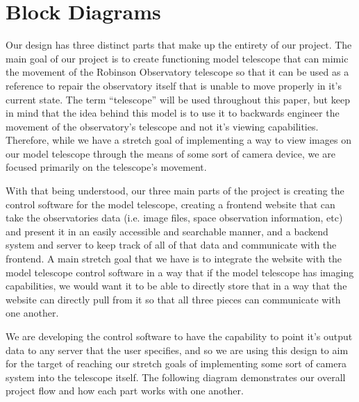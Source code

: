 \documentclass[12pt]{article}
\begin{document}
\section{Block Diagrams}

Our design has three distinct parts that make up the entirety of our project. The main goal of our project is to create functioning model telescope that can mimic the movement of the Robinson Observatory telescope so that it can be used as a reference to repair the observatory itself that is unable to move properly in it’s current state. The term “telescope” will be used throughout this paper, but keep in mind that the idea behind this model is to use it to backwards engineer the movement of the observatory’s telescope and not it’s viewing capabilities. Therefore, while we have a stretch goal of implementing a way to view images on our model telescope through the means of some sort of camera device, we are focused primarily on the telescope’s movement.

With that being understood, our three main parts of the project is creating the control software for the model telescope, creating a frontend website that can take the observatories data (i.e. image files, space observation information, etc) and present it in an easily accessible and searchable manner, and a backend system and server to keep track of all of that data and communicate with the frontend. A main stretch goal that we have is to integrate the website with the model telescope control software in a way that if the model telescope has imaging capabilities, we would want it to be able to directly store that in a way that the website can directly pull from it so that all three pieces can communicate with one another.

We are developing the control software to have the capability to point it’s output data to any server that the user specifies, and so we are using this design to aim for the target of reaching our stretch goals of implementing some sort of camera system into the telescope itself. The following diagram demonstrates our overall project flow and how each part works with one another.

\newpage
\end{document}
